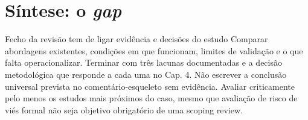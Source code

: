 \section{Síntese: o \emph{gap}}
\label{sec:gap}
{Fecho da revisão tem de ligar evidência e decisões do estudo}
{Comparar abordagens existentes, condições em que funcionam, limites de
validação e o que falta operacionalizar. Terminar com três lacunas
documentadas e a decisão metodológica que responde a cada uma no Cap. 4.
Não escrever a conclusão universal prevista no comentário-esqueleto sem
evidência. Avaliar criticamente pelo menos os estudos mais próximos do
caso, mesmo que avaliação de risco de viés formal não seja objetivo
obrigatório de uma scoping review.}%



